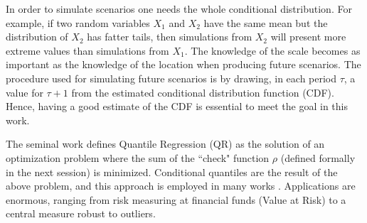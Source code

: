 In order to simulate scenarios one needs the whole conditional distribution. For example, if two random variables $X_1$ and $X_2$ have the same mean but the distribution of $X_2$ has fatter tails, then simulations from $X_2$ will present more extreme values than simulations from $X_1$. The knowledge of the scale becomes as important as the knowledge of the location when producing future scenarios. The procedure used for simulating future scenarios is by drawing, in each period $\tau$, a value for $\tau+1$ from the estimated conditional distribution function (CDF). Hence, having a good estimate of the CDF is essential to meet the goal in this work. 

The seminal work \cite{koenker1978regression} defines Quantile Regression (QR) as the solution of an optimization problem where the sum of the ``check" function $\rho$ (defined formally in the next session) is minimized. Conditional quantiles are the result of the above problem, and this approach is employed in many works \cite{chao_quantile_2012,li_quantile_2007,bosch_convergent_nodate,gallego2016line,moller_time-adaptive_2008,nielsen2006,bremnes_probabilistic_2004,wan_direct_2017}. Applications are enormous, ranging from risk measuring at financial funds (Value at Risk) to a central measure robust to outliers.







%







